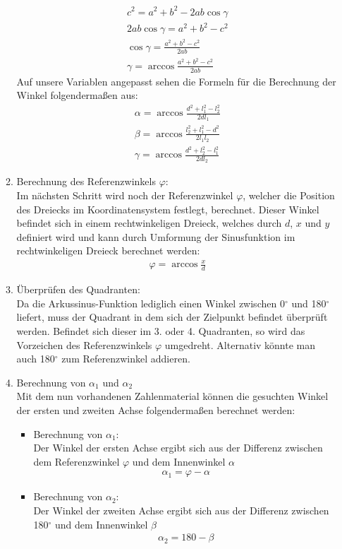 \begin{itemize}
\begin{enumerate}
\begin{align*}
c^2 = a^2 + b^2 - 2ab \cos \gamma \\
2ab \cos \gamma = a^2 + b^2 - c^2 \\
\cos \gamma = \frac{a^2 + b^2 - c^2}{2ab} \\
\gamma = \arccos \frac{a^2 + b^2 - c^2}{2ab}
\end{align*}
Auf unsere Variablen angepasst sehen die Formeln für die Berechnung der Winkel folgendermaßen aus:
\begin{align*}
\alpha = \arccos \frac{d^2 + l_1^2 - l_2^2}{2dl_1} \\
\beta = \arccos \frac{l_2^2 + l_1^2 - d^2}{2l_1l_2} \\
\gamma = \arccos \frac{d^2 + l_2^2 - l_1^2}{2dl_2}
\end{align*}
\item Berechnung des Referenzwinkels $\varphi$:\\
Im nächsten Schritt wird noch der Referenzwinkel $\varphi$, welcher die Position des Dreiecks im Koordinatensystem festlegt, berechnet. Dieser Winkel befindet sich in einem rechtwinkeligen Dreieck, welches durch $d$, $x$ und $y$ definiert wird und kann durch Umformung der Sinusfunktion im rechtwinkeligen Dreieck berechnet werden:
\begin{align*}
\varphi = \arccos \frac{x}{d}
\end{align*}
\item Überprüfen des Quadranten:\\
Da die Arkussinus-Funktion lediglich einen Winkel zwischen 0$^\circ$ und 180$^\circ$ liefert, muss der Quadrant in dem sich der Zielpunkt befindet überprüft werden. Befindet sich dieser im 3. oder 4. Quadranten, so wird das Vorzeichen des Referenzwinkels $\varphi$ umgedreht. Alternativ könnte man auch 180$^\circ$ zum Referenzwinkel addieren.
\item Berechnung von $\alpha_1$ und $\alpha_2$\\
Mit dem nun vorhandenen Zahlenmaterial können die gesuchten Winkel der ersten und zweiten Achse folgendermaßen berechnet werden:
\begin{itemize}
\item Berechnung von $\alpha_1$:\\
Der Winkel der ersten Achse ergibt sich aus der Differenz zwischen dem Referenzwinkel $\varphi$ und dem Innenwinkel $\alpha$
\begin{align*}
\alpha_1 = \varphi - \alpha
\end{align*}
\item Berechnung von $\alpha_2$:\\
Der Winkel der zweiten Achse ergibt sich aus der Differenz zwischen 180$^\circ$ und dem Innenwinkel $\beta$
\begin{align*}
\alpha_2 = 180 - \beta
\end{align*}
\end{itemize}

\end{enumerate}
\end{itemize}